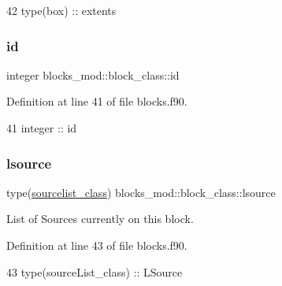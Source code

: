 \begin{DoxyCode}
42         \textcolor{keywordtype}{type}(box) :: extents
\end{DoxyCode}
\mbox{\label{structblocks__mod_1_1block__class_addd1a493d56aa1ffd1bc27c56b682065}} 
\subsubsection{\texorpdfstring{id}{id}}
{\footnotesize\ttfamily integer blocks\+\_\+mod\+::block\+\_\+class\+::id\hspace{0.3cm}{\ttfamily [private]}}



Definition at line 41 of file blocks.\+f90.


\begin{DoxyCode}
41         \textcolor{keywordtype}{integer} :: id
\end{DoxyCode}
\mbox{\label{structblocks__mod_1_1block__class_a2f4d63afb2696e2728f20a99e26a4b18}} 
\subsubsection{\texorpdfstring{lsource}{lsource}}
{\footnotesize\ttfamily type(\mbox{\hyperlink{structsources__list__mod_1_1sourcelist__class}{sourcelist\+\_\+class}}) blocks\+\_\+mod\+::block\+\_\+class\+::lsource\hspace{0.3cm}{\ttfamily [private]}}



List of Sources currently on this block. 



Definition at line 43 of file blocks.\+f90.


\begin{DoxyCode}
43         \textcolor{keywordtype}{type}(sourceList\_class) :: LSource
\end{DoxyCode}
\mbox{\label{structblocks__mod_1_1block__class_ab4e2108886a09ba919d01474503f6165}} 
